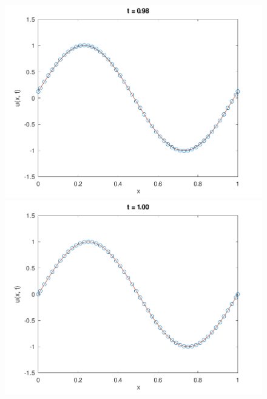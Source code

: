 \documentclass[
	8pt,
	professionalfonts,
	leqno,
	intlimits,
	c,
    aspectratio=1610,
]{beamer}
\begin{document}
\begin{frame}
\begin{figure}[H]
        \includegraphics[width=.4\paperwidth]{../examples/octave/hyperbolic1D49.pdf}
        \includegraphics[width=.4\paperwidth]{../examples/octave/hyperbolic1D50.pdf}
    \end{figure}
\end{frame}
\end{document}
